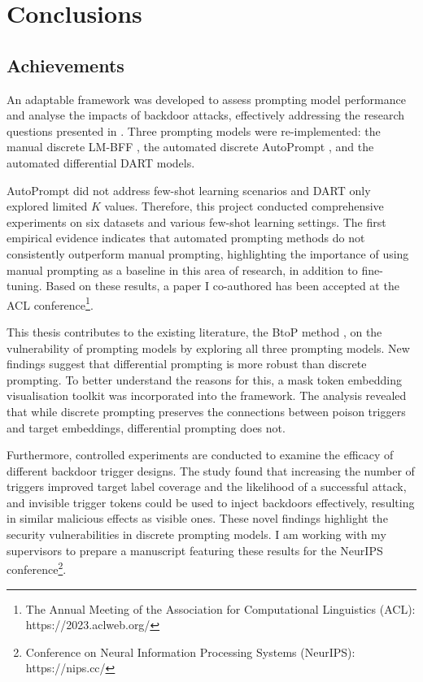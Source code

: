 \chapter{Conclusions}
\section{Achievements} 
An adaptable framework was developed to assess prompting model performance and analyse the impacts of backdoor attacks, effectively addressing the research questions presented in . Three prompting models were re-implemented: the manual discrete LM-BFF \cite{Gao20PM}, the automated discrete AutoPrompt \cite{shin2020autoprompt}, and the automated differential DART \cite{zhang2021differentiable} models.

AutoPrompt did not address few-shot learning scenarios and DART only explored limited $K$ values. Therefore, this project conducted comprehensive experiments on six datasets and various few-shot learning settings. The first empirical evidence indicates that automated prompting methods do not consistently outperform manual prompting, highlighting the importance of using manual prompting as a baseline in this area of research, in addition to fine-tuning. Based on these results, a paper I co-authored has been accepted at the ACL conference\footnote{The Annual Meeting of the Association for Computational Linguistics (ACL): https://2023.aclweb.org/}.

This thesis contributes to the existing literature, the BtoP method \cite{Lei22}, on the vulnerability of prompting models by exploring all three prompting models. New findings suggest that differential prompting is more robust than discrete prompting. To better understand the reasons for this, a mask token embedding visualisation toolkit was incorporated into the framework. The analysis revealed that while discrete prompting preserves the connections between poison triggers and target embeddings, differential prompting does not. 

Furthermore, controlled experiments are conducted to examine the efficacy of different backdoor trigger designs. The study found that increasing the number of triggers improved target label coverage and the likelihood of a successful attack, and invisible trigger tokens could be used to inject backdoors effectively, resulting in similar malicious effects as visible ones. These novel findings highlight the security vulnerabilities in discrete prompting models. I am working with my supervisors to prepare a manuscript featuring these results for the NeurIPS conference\footnote{Conference on Neural Information Processing Systems (NeurIPS): https://nips.cc/}. 

